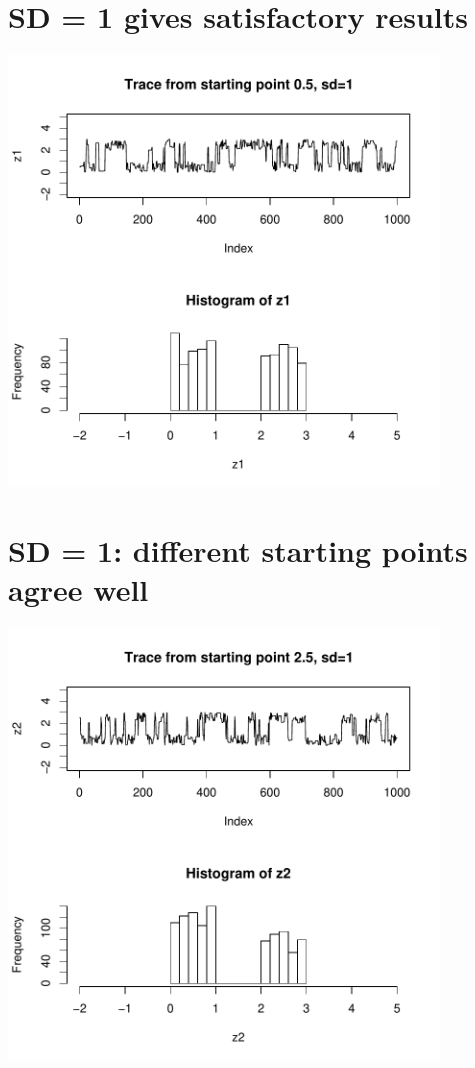 \es\bs

\section*{SD = 1 gives satisfactory results}
\centerline{\includegraphics[height=4.5in]{figures/goodtrace1.pdf}}
\es\bs

\section*{SD = 1: different starting points agree well}
\centerline{\includegraphics[height=4.5in]{figures/goodtrace2.pdf}}

